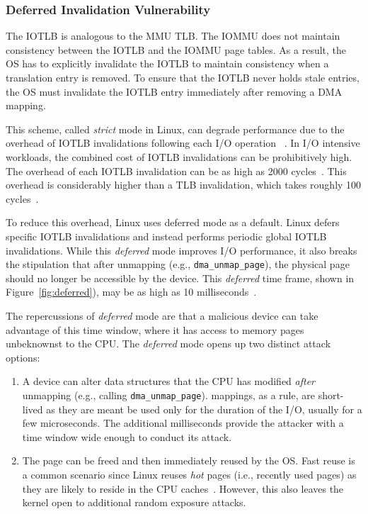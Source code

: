 \subsubsection{Deferred Invalidation Vulnerability}\label{sec:deferred}
The IOTLB is analogous to the MMU TLB. The IOMMU does not maintain consistency between the IOTLB and the IOMMU page tables. As a result, the OS has to explicitly invalidate the IOTLB to maintain consistency when a translation entry is removed. To ensure that the IOTLB never holds stale entries, the OS must invalidate the IOTLB entry immediately after removing a DMA mapping. 

This scheme, called \emph{strict} mode in Linux, can degrade performance due to the overhead of IOTLB invalidations following each I/O operation ~\cite{MMT16,MSMT18,Peleg15}. In I/O intensive workloads, the combined cost of IOTLB invalidations can be prohibitively high. The overhead of each IOTLB invalidation can be as high as 2000 cycles~\cite{ABYTS11}. This overhead is considerably higher than a TLB invalidation, which takes roughly 100 cycles~\cite{Han14}. 

To reduce this overhead, Linux uses deferred mode as a default. Linux defers specific IOTLB invalidations and instead performs periodic global IOTLB invalidations. While this \emph{deferred} mode improves I/O performance, it also breaks the stipulation that after unmapping (e.g., \texttt{dma\_unmap\_page}), the physical page should no longer be accessible by the device. This \emph{deferred} time frame, shown in Figure~\ref{fig:deferred}), may be as high as 10 milliseconds~\cite{MSMT18}.

The repercussions of \emph{deferred} mode are that a malicious device can take advantage of this time window, where it has access to memory pages unbeknownst to the CPU. The \emph{deferred} mode opens up two distinct attack options:

\begin{enumerate}[labelindent=0pt]
    \item A device can alter data structures that the CPU has modified \emph{after} unmapping (e.g., calling \texttt{dma\_unmap\_page}).
    \iova{} mappings, as a rule, are short-lived as they are meant be used only for the duration of the I/O, usually for a few microseconds. The additional milliseconds provide the attacker with a time window wide enough to conduct its attack.
    \item The page can be freed and then immediately reused by the OS. Fast reuse is a common scenario since Linux reuses \emph{hot} pages (i.e., recently used pages) as they are likely to reside in the CPU caches~\cite{hotcold}. However, this also leaves the kernel open to additional random exposure attacks.
\end{enumerate}



